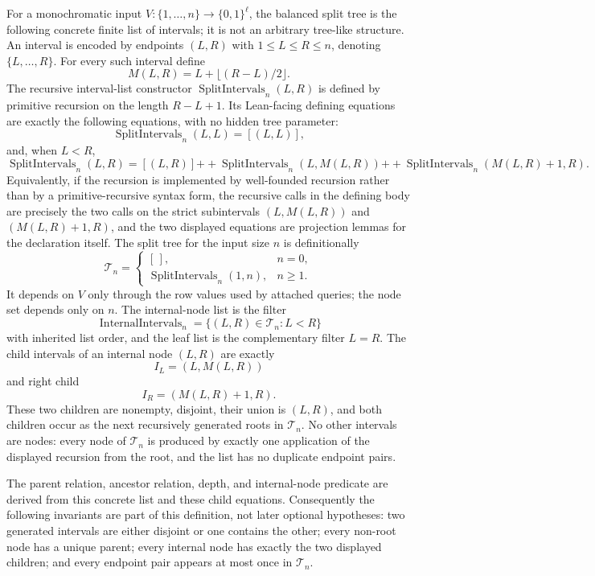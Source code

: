 \begin{definition}
  \label{def:minip-balanced-recursive-split-tree}
  For a monochromatic input
  $V:\{1,\ldots,n\}\to\{0,1\}^{\ell}$, the balanced split tree is the
  following concrete finite list of intervals; it is not an arbitrary
  tree-like structure.  An interval is encoded by endpoints $(L,R)$ with
  $1\leq L\leq R\leq n$, denoting $\{L,\ldots,R\}$.  For every such interval
  define
  \[
    M(L,R)=L+\lfloor(R-L)/2\rfloor .
  \]
  The recursive interval-list constructor
  $\operatorname{SplitIntervals}_n(L,R)$ is defined by primitive recursion on
  the length $R-L+1$.  Its Lean-facing defining equations are exactly the
  following equations, with no hidden tree parameter:
  \[
    \operatorname{SplitIntervals}_n(L,L)=[(L,L)],
  \]
  and, when $L<R$,
  \[
    \operatorname{SplitIntervals}_n(L,R)
      =
      [(L,R)]
      \mathbin{++}
      \operatorname{SplitIntervals}_n(L,M(L,R))
      \mathbin{++}
      \operatorname{SplitIntervals}_n(M(L,R)+1,R).
  \]
  Equivalently, if the recursion is implemented by well-founded recursion
  rather than by a primitive-recursive syntax form, the recursive calls in the
  defining body are precisely the two calls on the strict subintervals
  $(L,M(L,R))$ and $(M(L,R)+1,R)$, and the two displayed equations are
  projection lemmas for the declaration itself.
  The split tree for the input size $n$ is definitionally
  \[
    \mathcal T_n=
    \begin{cases}
      [\,], & n=0,\\
      \operatorname{SplitIntervals}_n(1,n), & n\geq1.
    \end{cases}
  \]
  It depends on $V$ only through the row values used by attached queries; the
  node set depends only on $n$.  The internal-node list is the filter
  \[
    \operatorname{InternalIntervals}_n
      =\{(L,R)\in\mathcal T_n : L<R\}
  \]
  with inherited list order, and the leaf list is the complementary filter
  $L=R$.  The child intervals of an internal node $(L,R)$ are exactly
  \[
    I_L=(L,M(L,R))
  \]
  and right child
  \[
    I_R=(M(L,R)+1,R).
  \]
  These two children are nonempty, disjoint, their union is $(L,R)$, and both
  children occur as the next recursively generated roots in $\mathcal T_n$.
  No other intervals are nodes: every node of $\mathcal T_n$ is produced by
  exactly one application of the displayed recursion from the root, and the
  list has no duplicate endpoint pairs.

  The parent relation, ancestor relation, depth, and internal-node predicate
  are derived from this concrete list and these child equations.  Consequently
  the following invariants are part of this definition, not later optional
  hypotheses: two generated intervals are either disjoint or one contains the
  other; every non-root node has a unique parent; every internal node has
  exactly the two displayed children; and every endpoint pair appears at most
  once in $\mathcal T_n$.


\end{definition}
